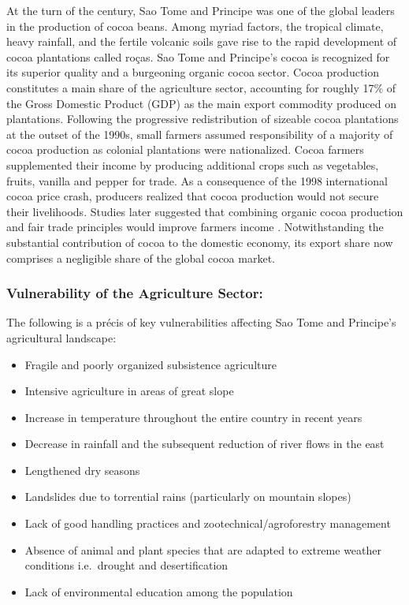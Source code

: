 \documentclass[
]{book}
\providecommand{\tightlist}{%
  \setlength{\itemsep}{0pt}\setlength{\parskip}{0pt}}
\begin{document}
At the turn of the century, Sao Tome and Principe was one of the global leaders in the production of cocoa beans. Among myriad factors, the tropical climate, heavy rainfall, and the fertile volcanic soils gave rise to the rapid development of cocoa plantations called roças. Sao Tome and Principe's cocoa is recognized for its superior quality and a burgeoning organic cocoa sector. Cocoa production constitutes a main share of the agriculture sector, accounting for roughly 17\% of the Gross Domestic Product (GDP) as the main export commodity produced on plantations. Following the progressive redistribution of sizeable cocoa plantations at the outset of the 1990s, small farmers assumed responsibility of a majority of cocoa production as colonial plantations were nationalized. Cocoa farmers supplemented their income by producing additional crops such as vegetables, fruits, vanilla and pepper for trade. As a consequence of the 1998 international cocoa price crash, producers realized that cocoa production would not secure their livelihoods. Studies later suggested that combining organic cocoa production and fair trade principles would improve farmers income . Notwithstanding the substantial contribution of cocoa to the domestic economy, its export share now comprises a negligible share of the global cocoa market.

\hypertarget{vulnerability-of-the-agriculture-sector-1}{%
\subsubsection{Vulnerability of the Agriculture Sector:}\label{vulnerability-of-the-agriculture-sector-1}}

The following is a précis of key vulnerabilities affecting Sao Tome and Principe's agricultural landscape:

\begin{itemize}
\tightlist
\item
  Fragile and poorly organized subsistence agriculture
\item
  Intensive agriculture in areas of great slope
\item
  Increase in temperature throughout the entire country in recent years
\item
  Decrease in rainfall and the subsequent reduction of river flows in the east
\item
  Lengthened dry seasons
\item
  Landslides due to torrential rains (particularly on mountain slopes)
\item
  Lack of good handling practices and zootechnical/agroforestry management
\item
  Absence of animal and plant species that are adapted to extreme weather conditions i.e.~drought and desertification
\item
  Lack of environmental education among the population
\end{itemize}
\end{document}

